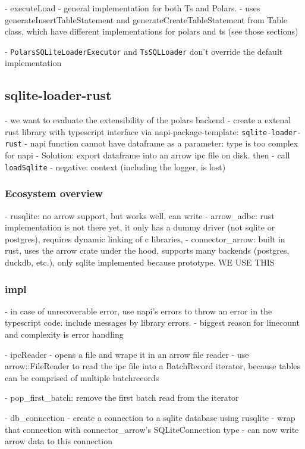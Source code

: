 - executeLoad
- general implementation for both Ts and Polars.
- uses generateInsertTableStatement and generateCreateTableStatement from Table class, which have different implementations for polars and ts (see those sections)

- \Verb|PolarsSQLiteLoaderExecutor| and \Verb|TsSQLLoader| don't override the default implementation

\subsection{sqlite-loader-rust}
- we want to evaluate the extensibility of the polars backend
- create a extenal rust library with typescript interface via napi-package-template: \Verb|sqlite-loader-rust|
- napi function cannot have dataframe as a parameter: type is too complex for napi
- Solution: export dataframe into an arrow ipc file on disk. then
- call \Verb|loadSqlite|
- negative: context (including the logger, is lost)

\subsubsection{Ecosystem overview}
- rusqlite: no arrow support, but works well, can write
- arrow\_adbc: rust implementation is not there yet, it only has a dummy driver (not sqlite or postgres), requires dynamic linking of c libraries,
- connector\_arrow: built in rust, uses the arrow crate under the hood, supports many backends (postgres, duckdb, etc.), only sqlite implemented because prototype. WE USE THIS

\subsubsection{impl}
- in case of unrecoverable error, use napi's errors to throw an error in the typescript code. include messages by library errors.
- biggest reason for linecount and complexity is error handling

- ipcReader
- opens a file and wrape it in an arrow file reader
- use arrow::FileReader to read the ipc file into a BatchRecord iterator, because tables can be comprised of multiple batchrecords

- pop_first_batch: remove the first batch read from the iterator

- db_connection
- create a connection to a sqlite database using rusqlite
- wrap that connection with connector\_arrow's SQLiteConnection type
- can now write arrow data to this connection

